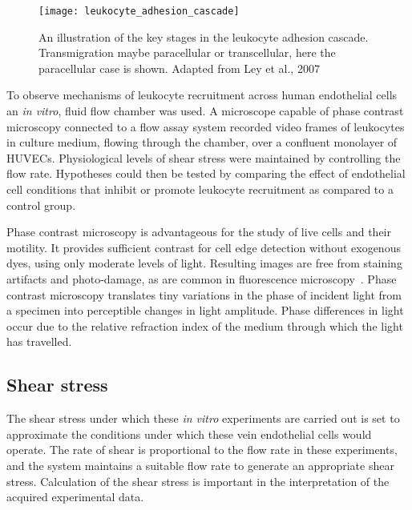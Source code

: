 \begin{figure}[htbp!]
	\centering
	\texttt{[image: leukocyte\_adhesion\_cascade]}
	\caption[The leukocyte adhesion cascade]{An illustration of the key stages in the leukocyte adhesion cascade. Transmigration maybe paracellular or transcellular, here the paracellular case is shown. Adapted from Ley et al., 2007~\cite{Ley2007}}
	\label{figure:leukocyte_adhesion_cascade}
\end{figure}

To observe mechanisms of leukocyte recruitment across human endothelial cells an \emph{in vitro}, fluid flow chamber was used. A microscope capable of phase contrast microscopy connected to a flow assay system recorded video frames of leukocytes in culture medium, flowing through the chamber, over a confluent monolayer of HUVECs. Physiological levels of shear stress were maintained by controlling the flow rate. Hypotheses could then be tested by comparing the effect of endothelial cell conditions that inhibit or promote leukocyte recruitment as compared to a control group.

Phase contrast microscopy is advantageous for the study of live cells and their motility. It provides sufficient contrast for cell edge detection without exogenous dyes, using only moderate levels of light. Resulting images are free from staining artifacts and photo-damage, as are common in fluorescence microscopy~\cite{Ambuhl2012}. Phase contrast microscopy translates tiny variations in the phase of incident light from a specimen into perceptible changes in light amplitude. Phase differences in light occur due to the relative refraction index of the medium through which the light has travelled.

\subsection{Shear stress}
\label{leukocytes:introduction:shear}
The shear stress under which these \emph{in vitro} experiments are carried out is set to approximate the conditions under which these vein endothelial cells would operate. The rate of shear is proportional to the flow rate in these experiments, and the system maintains a suitable flow rate to generate an appropriate shear stress. Calculation of the shear stress is important in the interpretation of the acquired experimental data.

